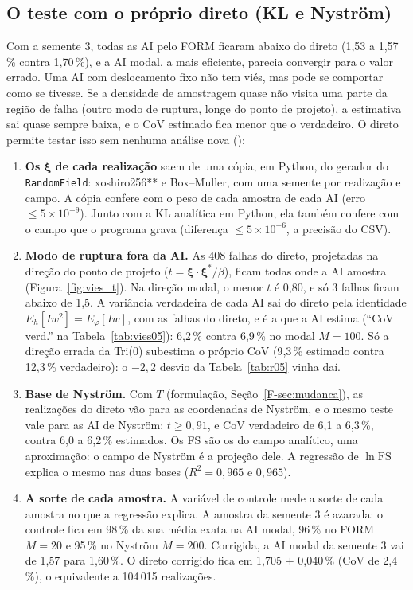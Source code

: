 \documentclass[11pt,a4paper]{article}
\begin{document}
\subsection{O teste com o próprio direto (KL e Nyström)}\label{sec:diag}
Com a semente 3, todas as AI pelo FORM ficaram abaixo do direto (1,53 a 1,57\,\% contra 1,70\,\%), e a AI modal, a mais
eficiente, parecia convergir para o valor errado. Uma AI com deslocamento fixo não tem viés, mas pode se comportar como se
tivesse. Se a densidade de amostragem quase não visita uma parte da região de falha (outro modo de ruptura, longe do
ponto de projeto), a estimativa sai quase sempre baixa, e o CoV estimado fica menor que o verdadeiro. O direto permite
testar isso sem nenhuma análise nova ():
\begin{enumerate}
  \item \textbf{Os $\bm\xi$ de cada realização} saem de uma cópia, em Python, do gerador do \texttt{RandomField}:
    xoshiro256** e Box--Muller, com uma semente por realização e campo. A cópia confere com o peso de cada amostra de cada
    AI (erro $\le 5\times10^{-9}$). Junto com a KL analítica em Python, ela
    também confere com o campo que o programa grava (diferença $\le 5\times10^{-6}$, a precisão do CSV).
  \item \textbf{Modo de ruptura fora da AI.} As 408 falhas do direto, projetadas na direção
    do ponto de projeto ($t = \bm\xi\cdot\bm\xi^*/\beta$), ficam todas onde a AI amostra (Figura~\ref{fig:vies_t}). Na direção
    modal, o menor $t$ é 0{,}80, e só 3 falhas ficam abaixo de
    1,5. A variância verdadeira de cada AI sai do direto pela identidade $E_h[I w^2] = E_\varphi[I w]$, com as falhas do
    direto, e é a que a AI estima (``CoV verd.'' na Tabela~\ref{tab:vies05}): 6{,}2\,\% contra 6{,}9\,\% no modal $M = 100$. Só a direção errada da Tri(0)
    subestima o próprio CoV (9{,}3\,\% estimado contra 12{,}3\,\% verdadeiro): o $-2{,}2$ desvio da Tabela~\ref{tab:r05} vinha daí.
  \item \textbf{Base de Nyström.} Com $T$ (formulação, Seção~\ref{F-sec:mudanca}), as realizações do direto vão para as coordenadas de
    Nyström, e o mesmo teste vale para as AI de Nyström: $t \ge 0{,}91$, e
    CoV verdadeiro de 6{,}1 a 6{,}3\,\%, contra 6{,}0 a 6{,}2\,\% estimados. Os FS são os do campo
    analítico, uma aproximação: o campo de Nyström é a projeção dele. A regressão de $\ln\mathrm{FS}$ explica o mesmo nas
    duas bases ($R^2 = 0{,}965$ e $0{,}965$).
  \item \textbf{A sorte de cada amostra.} A variável de controle mede a sorte de cada amostra no que a regressão explica.
    A amostra da semente 3 é azarada: o controle fica em 98\,\% da sua média exata na
    AI modal, 96\,\% no FORM $M = 20$ e 95\,\%
    no Nyström $M = 200$. Corrigida, a AI modal da semente 3 vai de 1{,}57 para 1{,}60\,\%. O direto corrigido fica em 1{,}705 $\pm$ 0{,}040\,\%
    (CoV de 2{,}4\,\%), o equivalente a 104\,015 realizações.
\end{enumerate}
\end{document}
